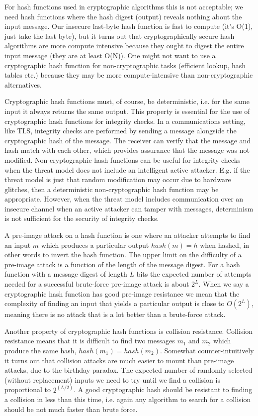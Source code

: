 For hash functions used in cryptographic algorithms this is not acceptable; we need hash functions where the hash digest (output) reveals nothing about the input message. Our insecure last-byte hash function is fast to compute (it's O(1), just take the last byte), but it turns out that cryptographically secure hash algorithms are more compute intensive because they ought to digest the entire input message (they are at least O(N)). One might not want to use a cryptographic hash function for non-cryptographic tasks (efficient lookup, hash tables etc.) because they may be more compute-intensive than non-cryptographic alternatives.

Cryptographic hash functions must, of course, be deterministic, i.e. for the same input it always returns the same output.
This property is essential for the use of cryptographic hash functions for integrity checks. In a communications setting,
like \ac{TLS}, integrity checks are performed by sending a message alongside the cryptographic hash of the message.
The receiver can verify that the message and hash match with each other, which provides assurance that
the message was not modified.
Non-cryptographic hash functions can be useful for integrity checks when the threat model does not include an
intelligent active attacker. E.g. if the threat model is just that random modification may occur due to hardware glitches,
then a deterministic non-cryptographic hash function may be appropriate.
However,
when the threat model includes communication over an insecure channel when an active attacker can tamper with messages,
determinism is not sufficient for the security of integrity checks.

A pre-image attack on a hash function is one where an attacker attempts to find an input $m$ which produces a particular output $hash(m)=h$ when hashed, in other words to invert the hash function. The upper limit on the difficulty of a pre-image attack is a function of the length of the message digest. For a hash function with a message digest of length $L$ bits the expected number of attempts needed for a successful brute-force pre-image attack is about $2^L$. When we say a cryptographic hash function has good pre-image resistance we mean that the complexity of finding an input that yields a particular output is close to $O(2^L)$,
meaning there is no attack that is a lot better than a brute-force attack.

Another property of cryptographic hash functions is collision resistance. Collision resistance means that it is difficult to find two messages $m_1$ and $m_2$ which produce the same hash, $hash(m_1)=hash(m_2)$. Somewhat counter-intuitively it turns out that collision attacks are much easier to mount than pre-image attacks, due to the birthday paradox. The expected number of randomly selected (without replacement) inputs we need to try until we find a collision is proportional to $2^(L/2)$. A good cryptographic hash should be resistant to finding a collision in less than this time, i.e. again any algorithm to search for a collision should be not much faster than brute force.

